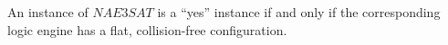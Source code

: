 % 
% 
% 
\begin{thm}\label{thm:Satisfiability-1}
 An instance of $NAE3SAT$ is a ``yes'' instance if and only if the corresponding logic engine has a
flat, collision-free configuration.
\end{thm}
\begin{pf}

\end{pf}
